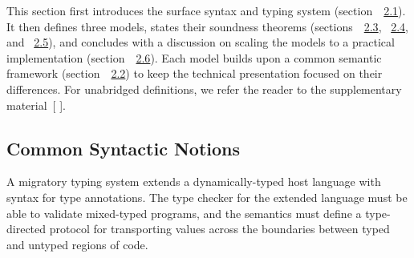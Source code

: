 \documentclass[screen=true, 10pt, acmsmall]{acmart}
\newcommand{\SecRef}[2]{section~#1}
\newcommand{\SectionNumberLink}[2]{\hyperref[#1]{#2}}
\let\SOriginalthesubsubsection\thesubsubsection
\newcommand{\Ssubsection}[2]{\subsection[#1]{#2}\let\thesubsubsection\SOriginalthesubsubsection}
\newcommand{\AutobibLink}[1]{\color{ACMPurple}{#1}}
\newcommand{\Autobibref}[1]{#1}
\providecommand{\AutobibLink}[1]{#1}
\renewcommand{\SecRef}[2]{~#1}
\newcommand{\HOlong}{Higher-Order}
\newcommand{\EOlong}{Erasure}
\newcommand{\FOlong}{First-Order}
\begin{document}
This section first introduces the surface syntax and typing
 system (section~\SecRef{\SectionNumberLink{t:x28part_x22secx3acommonx2dsyntaxx22x29}{2.1}}{Common Syntactic Notions}).
It then defines three models,
 states their soundness theorems (sections~\SecRef{\SectionNumberLink{t:x28part_x22secx3anaturalx2dembeddingx22x29}{2.3}}{\relax{\HOlong} Embedding}, \SecRef{\SectionNumberLink{t:x28part_x22secx3aerasurex2dembeddingx22x29}{2.4}}{\relax{\EOlong} Embedding}, and \SecRef{\SectionNumberLink{t:x28part_x22secx3alocallyx2ddefensivex2dembeddingx22x29}{2.5}}{\relax{\FOlong} Embedding}),
 and concludes with a discussion on scaling the models to a practical implementation (section~\SecRef{\SectionNumberLink{t:x28part_x22secx3apracticalx2dsemanticsx22x29}{2.6}}{From Models to Implementations}).
Each model builds upon a common semantic framework (section~\SecRef{\SectionNumberLink{t:x28part_x22secx3acommonx2dsemanticsx22x29}{2.2}}{Common Semantic Notions})
 to keep the technical presentation focused on their differences.
For unabridged definitions, we refer the reader to the supplementary material\Autobibref{~[\hyperref[t:x28autobib_x22Ben_Greenman_and_Matthias_FelleisenA_Spectrum_of_Type_Soundness_and_Performance_Supplementary_MaterialNortheastern_Universityx2c_NUx2dCCISx2d2018x2d0022018x22x29]{\AutobibLink{Greenman and Felleisen}} \hyperref[t:x28autobib_x22Ben_Greenman_and_Matthias_FelleisenA_Spectrum_of_Type_Soundness_and_Performance_Supplementary_MaterialNortheastern_Universityx2c_NUx2dCCISx2d2018x2d0022018x22x29]{\AutobibLink{2018}}]}.

\Ssubsection{Common Syntactic Notions}{Common Syntactic Notions}\label{t:x28part_x22secx3acommonx2dsyntaxx22x29}

A migratory typing system extends a dynamically{-}typed host language
 with syntax for type annotations.
The type checker for the extended language must be able to validate mixed{-}typed
 programs, and the semantics must define a type{-}directed protocol for transporting
 values across the boundaries between typed and untyped regions of code.
\end{document}
